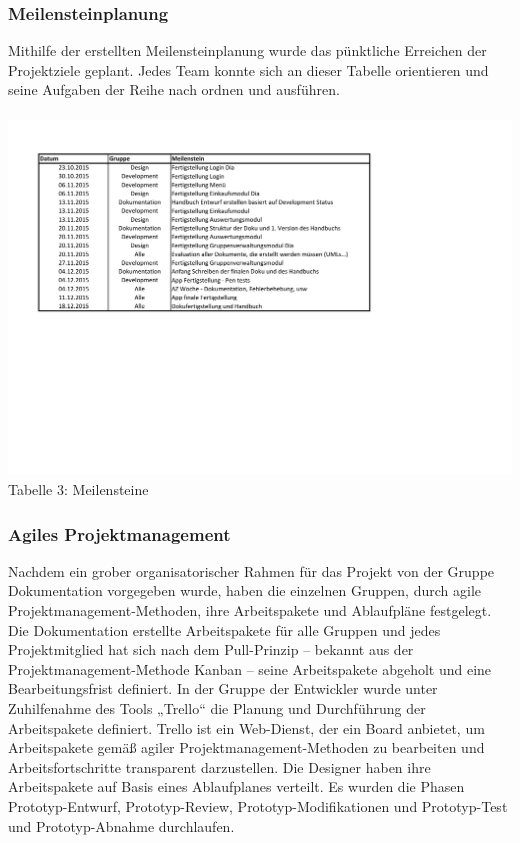 \documentclass[12pt,a4paper]{article}
\begin{document}
\subsubsection*{Meilensteinplanung}
Mithilfe der erstellten Meilensteinplanung wurde das pünktliche Erreichen der Projektziele geplant.
Jedes Team konnte sich an dieser Tabelle orientieren und seine Aufgaben der Reihe nach ordnen und ausführen.
\\
\\
\hspace*{-10mm} \includegraphics[trim = 10mm 90mm 10mm 20mm,clip, scale=0.9]{Meilensteine.pdf}
\\
\footnotesize Tabelle 3: Meilensteine
\normalsize

\subsubsection{Agiles Projektmanagement}
Nachdem ein grober organisatorischer Rahmen für das Projekt von der Gruppe Dokumentation vorgegeben wurde, haben die einzelnen Gruppen, durch agile Projektmanagement-Methoden,  ihre Arbeitspakete und Ablaufpläne festgelegt. 
Die Dokumentation erstellte Arbeitspakete für alle Gruppen und jedes Projektmitglied hat sich nach dem Pull-Prinzip – bekannt aus der Projektmanagement-Methode Kanban – seine Arbeitspakete abgeholt und eine Bearbeitungsfrist definiert. 
In der Gruppe der Entwickler wurde unter Zuhilfenahme des Tools „Trello“ die Planung und Durchführung der Arbeitspakete definiert. Trello ist ein Web-Dienst, der ein Board anbietet, um Arbeitspakete gemäß agiler Projektmanagement-Methoden zu bearbeiten und Arbeitsfortschritte transparent darzustellen. 
Die Designer haben ihre Arbeitspakete auf Basis eines Ablaufplanes verteilt. Es wurden die Phasen Prototyp-Entwurf, Prototyp-Review, Prototyp-Modifikationen und Prototyp-Test und Prototyp-Abnahme durchlaufen.
\newpage
\end{document}
